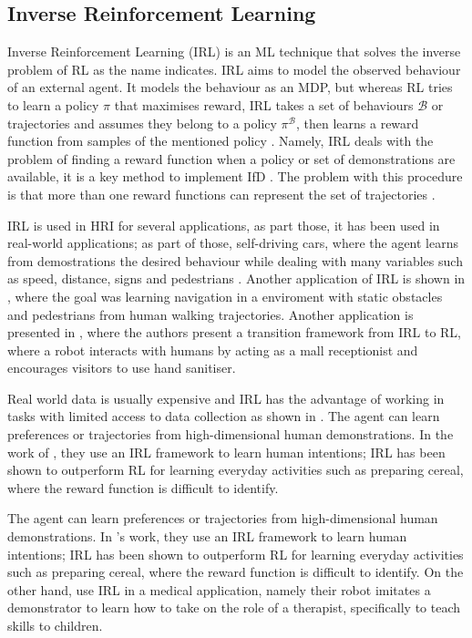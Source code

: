 \documentclass[thesis]{mas_proposal}
\begin{document}
	\subsection{Inverse Reinforcement Learning}
		
		Inverse Reinforcement Learning (IRL) is an ML technique that solves the inverse problem of RL as the name indicates. IRL aims to model the observed behaviour of an external agent. It models the behaviour as an MDP, but whereas RL tries to learn a policy $\pi$ that maximises reward, IRL takes a set of behaviours $\mathcal{B}$ or trajectories and assumes they belong to a policy $\pi^\mathcal{B}$, then learns a reward function from samples of the mentioned policy \cite{Heim2019}. Namely, IRL deals with the problem of finding a reward function when a policy or set of demonstrations are available, it is a key method to implement IfD \cite{Arora2021}. The problem with this procedure is that more than one reward functions can represent the set of trajectories \cite{Russell2000}. 
		
		IRL is used in HRI for several applications, as part those, it has been used in real-world applications; as part of those, self-driving cars, where the agent learns from demostrations the desired behaviour while dealing with many variables such as speed, distance, signs and pedestrians \cite{Arora2021} . Another application of IRL is shown in \cite{Kretzschmar2016}, where the goal was learning navigation in a enviroment with static obstacles and pedestrians from human walking trajectories. Another application is presented in \cite{Chen2023}, where the authors present a transition framework from IRL to RL, where a robot interacts with humans by acting as a mall receptionist and encourages visitors to use hand sanitiser. 
		
		Real world data is usually expensive and IRL has the advantage of working in tasks with limited access to data collection as shown in \cite{Chen2023}. The agent can learn preferences or trajectories from high-dimensional human demonstrations. In the work of \cite{Bhattacharyya2020}, they use an IRL framework to learn human intentions; IRL has been shown to outperform RL for learning everyday activities such as preparing cereal, where the reward function is difficult to identify. 
		
		The agent can learn preferences or trajectories from high-dimensional human demonstrations. In \cite{Bhattacharyya2020}'s work, they use an IRL framework to learn human intentions; IRL has been shown to outperform RL for learning everyday activities such as preparing cereal, where the reward function is difficult to identify. On the other hand, \cite{Hussein2019} use IRL in a medical application, namely their robot imitates a demonstrator to learn how to take on the role of a therapist, specifically to teach skills to children.  
		
\end{document}
